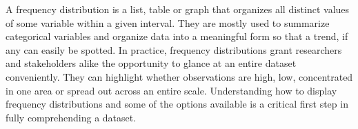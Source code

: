 
A frequency distribution is a list, table or graph that organizes all distinct
values of some variable within a given interval. They are mostly used to summarize
categorical variables and organize data into a meaningful form so that a trend, 
if any can easily be spotted. In practice, frequency distributions grant researchers 
and stakeholders alike the opportunity to glance at an entire dataset conveniently. 
They can highlight whether observations are high, low, concentrated in one area or 
spread out across an entire scale. Understanding how to display frequency distributions
and some of the options available is a critical first step in fully comprehending 
a dataset.  